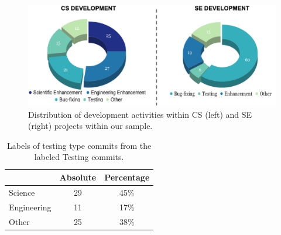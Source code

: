 \begin{figure}
     \centering
     \includegraphics[width=\linewidth]{img/development.png} 
     \caption{Distribution of development activities within CS (left) and SE (right) projects within our sample.}
     \label{fig:SE_activities}
 \end{figure}


\begin{table}[!t]
\caption{Labels of testing type commits from the labeled Testing commits.}\label{tbl:testing}


\vspace{3mm}

\begin{center}
\vspace{-10pt}\begin{tabular}{l|c|c}
 \multicolumn{1}{c|}{} & \multicolumn{1}{c|}{Absolute} & \multicolumn{1}{c}{Percentage}\\
\hline
Science & 29 & 45\% \\
Engineering & 11 & 17\% \\
Other & 25 & 38\% 
\end{tabular}
\end{center}
\vspace{3mm}
\end{table}




